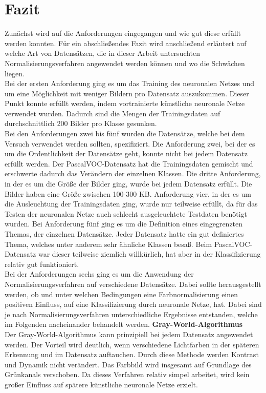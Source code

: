 \chapter{Fazit}\label{s.fazit}
Zunächst wird auf die Anforderungen eingegangen und wie gut diese erfüllt werden konnten. Für ein abschließendes Fazit wird anschließend erläutert auf welche Art von Datensätzen, die in dieser Arbeit untersuchten Normalisierungsverfahren angewendet werden können und wo die Schwächen liegen.\\
Bei der ersten Anforderung ging es um das Training des neuronalen Netzes und um eine Möglichkeit mit weniger Bildern pro Datensatz auszukommen. Dieser Punkt konnte erfüllt werden, indem vortrainierte künstliche neuronale Netze verwendet wurden. Dadurch sind die Mengen der Trainingsdaten auf durchschnittlich 200 Bilder pro Klasse gesunken.\\
Bei den Anforderungen zwei bis fünf wurden die Datensätze, welche bei dem Versuch verwendet werden sollten, spezifiziert. Die Anforderung zwei, bei der es um die Ordentlichkeit der Datensätze geht, konnte nicht bei jedem Datensatz erfüllt werden. Der PascalVOC-Datensatz hat die Trainingsdaten gemischt und erschwerte dadurch das Verändern der einzelnen Klassen. Die dritte Anforderung, in der es um die Größe der Bilder ging, wurde bei jedem Datensatz erfüllt. Die Bilder haben eine Größe zwischen 100-300 KB. Anforderung vier, in der es um die Ausleuchtung der Trainingsdaten ging, wurde nur teilweise erfüllt, da für das Testen der neuronalen Netze auch schlecht ausgeleuchtete Testdaten benötigt wurden. Bei Anforderung fünf ging es um die Definition eines eingegrenzten Themas, der einzelnen Datensätze. Jeder Datensatz hatte ein gut definiertes Thema, welches unter anderem sehr ähnliche Klassen besaß. Beim PascalVOC-Datensatz war dieser teilweise ziemlich willkürlich, hat aber in der Klassifizierung relativ gut funktioniert.\\
Bei der Anforderungen sechs ging es um die Anwendung der Normalisierungsverfahren auf verschiedene Datensätze. Dabei sollte herausgestellt werden, ob und unter welchen Bedingungen eine Farbnormalisierung einen positiven Einfluss, auf eine Klassifizierung durch neuronale Netze, hat. Dabei sind je nach Normalisierungsverfahren unterschiedliche Ergebnisse entstanden, welche im Folgenden nacheinander behandelt werden.
\newpage
\textbf{Gray-World-Algorithmus}\\
Der Gray-World-Algorithmus kann prinzipiell bei jedem Datensatz angewendet werden. Der Vorteil wird deutlich, wenn verschiedene Lichtfarben in der späteren Erkennung und im Datensatz auftauchen. Durch diese Methode werden Kontrast und Dynamik nicht verändert. Das Farbbild wird insgesamt auf Grundlage des Grünkanals verschoben. Da dieses Verfahren relativ simpel arbeitet, wird kein großer Einfluss auf spätere künstliche neuronale Netze erzielt.\\\\
